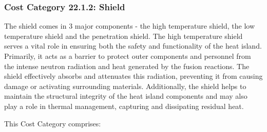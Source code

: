 \subsubsection*{Cost Category 22.1.2: Shield} 

The shield comes in 3 major components - the high temperature shield, the low temperature shield and the penetration shield. The high temperature shield serves a vital role in ensuring both the safety and functionality of the heat island. Primarily, it acts as a barrier to protect outer components and personnel from the intense neutron radiation and heat generated by the fusion reactions. The shield effectively absorbs and attenuates this radiation, preventing it from causing damage or activating surrounding materials. Additionally, the shield helps to maintain the structural integrity of the heat island components and may also play a role in thermal management, capturing and dissipating residual heat. 

This Cost Category comprises: 

